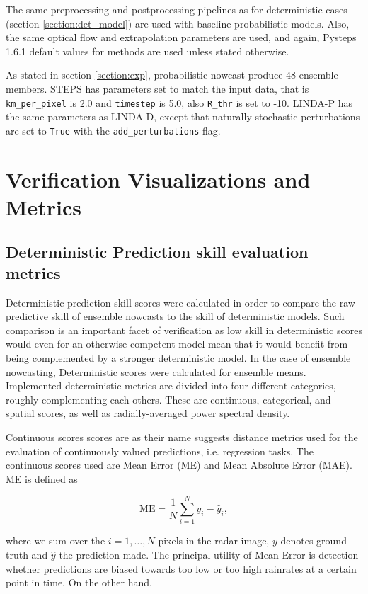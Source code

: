 The same preprocessing and postprocessing pipelines as for deterministic cases (section \ref{section:det_model}) are used with baseline probabilistic models. Also, the same optical flow and extrapolation parameters are used, and again, Pysteps 1.6.1 default values for methods are used unless stated otherwise. 

As stated in section \ref{section:exp}, probabilistic nowcast produce 48 ensemble members. STEPS has parameters set to match the input data, that is \texttt{km\_per\_pixel} is 2.0 and \texttt{timestep} is 5.0, also \texttt{R\_thr} is set to -10. LINDA-P has the same parameters as LINDA-D, except that naturally stochastic perturbations are set to \texttt{True} with the \texttt{add\_perturbations} flag.

\section{Verification Visualizations and Metrics}

\subsection{Deterministic Prediction skill evaluation metrics}
\label{section:det_metric}

Deterministic prediction skill scores were calculated in order to compare the raw predictive skill of ensemble nowcasts to the skill of deterministic models. Such comparison is an important facet of verification as low skill in deterministic scores would even for an otherwise competent model mean that it would benefit from being complemented by a stronger deterministic model. In the case of ensemble nowcasting, Deterministic scores were calculated for ensemble means. Implemented deterministic metrics are divided into four different categories, roughly complementing each others. These are continuous, categorical, and spatial scores, as well as radially-averaged power spectral density.  

Continuous scores scores are as their name suggests distance metrics used for the evaluation of continuously valued predictions, i.e. regression tasks. The continuous scores used are Mean Error (ME) and Mean Absolute Error (MAE). ME is defined as 

\begin{equation}
	\text{ME} = \frac{1}{N}\sum_{i=1}^{N} y_i - \hat{y}_i,
\end{equation}

where we sum over the $i=1,\dots,N$ pixels in the radar image, $y$ denotes ground truth and $\hat{y}$ the prediction made. The principal utility of Mean Error is detection whether predictions are biased towards too low or too high rainrates at a certain point in time. On the other hand, 

